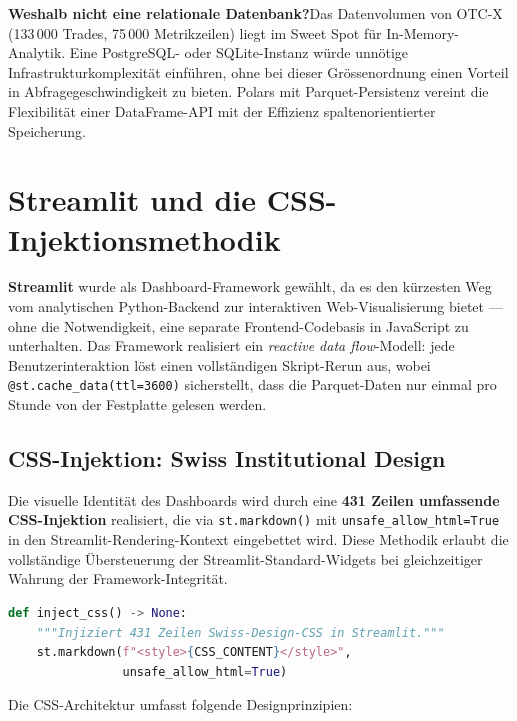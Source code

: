 \documentclass[11pt, a4paper, oneside, openany]{report}
\newcommand{\code}[1]{\texttt{\small\textcolor{DeepNavy}{#1}}}
\begin{document}
\textbf{Weshalb nicht eine relationale Datenbank?}\;Das Datenvolumen von OTC-X (133\,000 Trades, 75\,000 Metrikzeilen) liegt im Sweet Spot für In-Memory-Analytik. Eine PostgreSQL- oder SQLite-Instanz würde unnötige Infrastrukturkomplexität einführen, ohne bei dieser Grössenordnung einen Vorteil in Abfragegeschwindigkeit zu bieten. Polars mit Parquet-Persistenz vereint die Flexibilität einer DataFrame-API mit der Effizienz spaltenorientierter Speicherung.

\section{Streamlit und die CSS-Injektionsmethodik}
\label{sec:streamlit}

\textbf{Streamlit} wurde als Dashboard-Framework gewählt, da es den kürzesten Weg vom analytischen Python-Backend zur interaktiven Web-Visualisierung bietet --- ohne die Notwendigkeit, eine separate Frontend-Codebasis in JavaScript zu unterhalten. Das Framework realisiert ein \textit{reactive data flow}-Modell: jede Benutzerinteraktion löst einen vollständigen Skript-Rerun aus, wobei \code{@st.cache\_data(ttl=3600)} sicherstellt, dass die Parquet-Daten nur einmal pro Stunde von der Festplatte gelesen werden.

\subsection{CSS-Injektion: Swiss Institutional Design}

Die visuelle Identität des Dashboards wird durch eine \textbf{431 Zeilen umfassende CSS-Injektion} realisiert, die via \code{st.markdown()} mit \code{unsafe\_allow\_html=True} in den Streamlit-Rendering-Kontext eingebettet wird. Diese Methodik erlaubt die vollständige Übersteuerung der Streamlit-Standard-Widgets bei gleichzeitiger Wahrung der Framework-Integrität.

\begin{lstlisting}[language=Python, caption={CSS-Injektionsmuster (vereinfacht)}]
def inject_css() -> None:
    """Injiziert 431 Zeilen Swiss-Design-CSS in Streamlit."""
    st.markdown(f"<style>{CSS_CONTENT}</style>",
                unsafe_allow_html=True)
\end{lstlisting}

\noindent Die CSS-Architektur umfasst folgende Designprinzipien:
\end{document}
